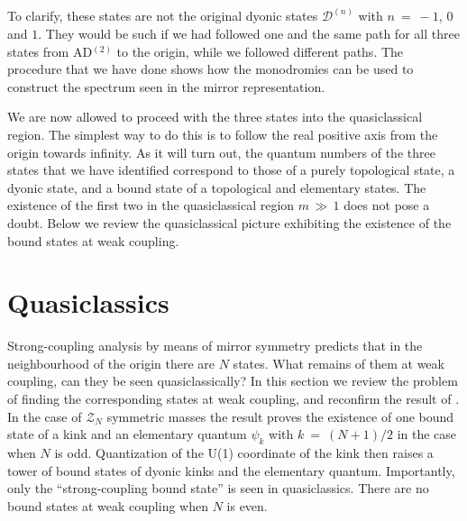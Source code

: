 \documentclass[epsfig,12pt]{article}
\newcommand{\mc}[1]{\mathcal{#1}}
\newcommand{\D}{\mathcal{D}}
\begin{document}
	To clarify, these states are not the original dyonic states $ \D^{(n)} $ with $ n ~=~ -1 $,
	$ 0 $ and $ 1 $.
	They would be such if we had followed one and the same path for all three states from AD$^{(2)}$ to
	the origin, while we followed different paths.
	The procedure that we have done shows how the monodromies can be used to construct the spectrum
	seen in the mirror representation.

	We are now allowed to proceed with the three states into the quasiclassical region.
	The simplest way to do this is to follow the real positive axis from the origin towards infinity.
	As it will turn out, the quantum numbers of the three states that we have identified correspond to those
	of a purely topological state, a dyonic state, and a bound state of a topological and elementary states.
	The existence of the first two in the quasiclassical region $ m \,\gg\, 1 $ does not pose a doubt.
	Below we review the quasiclassical picture exhibiting the existence of the bound states at weak coupling.


\newpage
\section{Quasiclassics}
\setcounter{equation}{0}

	Strong-coupling analysis by means of mirror symmetry predicts that in the neighbourhood of the origin
	there are $ N $ states.
	What remains of them at weak coupling, can they be seen quasiclassically?
	In this section we review the problem of finding the corresponding states at weak coupling, and 
	reconfirm the result of 
\cite{Dorey:1998yh}.
	In the case of $ \mc{Z}_N $ symmetric masses the result proves the existence of one bound state of a kink
	and an elementary quantum $ \psi_k $ with $ k ~=~ (N+1)/2 $ in the case when $ N $ is odd.
	Quantization of the U(1) coordinate of the kink then raises a tower of bound states of dyonic kinks
	and the elementary quantum.
	Importantly, only the ``strong-coupling bound state'' is seen in quasiclassics. 
	There are no bound states at weak coupling when $ N $ is even.
\end{document}
